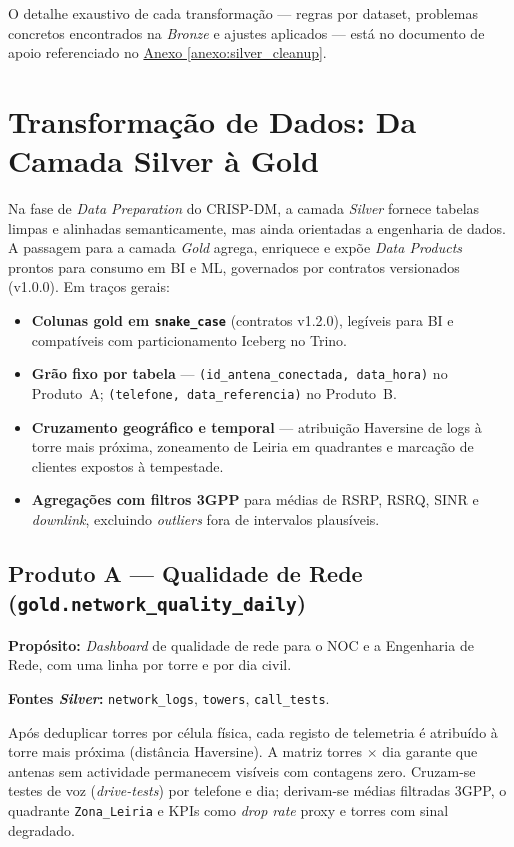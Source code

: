 \documentclass[runningheads]{llncs}
\begin{document}
O detalhe exaustivo de cada transformação --- regras por dataset, problemas concretos encontrados na \textit{Bronze} e ajustes aplicados --- está no documento de apoio referenciado no \hyperref[anexo:silver_cleanup]{Anexo \ref*{anexo:silver_cleanup}}.


\section{Transformação de Dados: Da Camada Silver à Gold}

Na fase de \textit{Data Preparation} do CRISP-DM, a camada \textit{Silver} fornece tabelas limpas e alinhadas semanticamente, mas ainda orientadas a engenharia de dados. A passagem para a camada \textit{Gold} agrega, enriquece e expõe \textit{Data Products} prontos para consumo em BI e ML, governados por contratos versionados (v1.0.0). Em traços gerais:

\begin{itemize}
    \item \textbf{Colunas gold em \texttt{snake\_case}} (contratos v1.2.0), legíveis para BI e compatíveis com particionamento Iceberg no Trino.
    \item \textbf{Grão fixo por tabela} --- \texttt{(id\_antena\_conectada, data\_hora)} no Produto~A; \texttt{(telefone, data\_referencia)} no Produto~B.
    \item \textbf{Cruzamento geográfico e temporal} --- atribuição Haversine de logs à torre mais próxima, zoneamento de Leiria em quadrantes e marcação de clientes expostos à tempestade.
    \item \textbf{Agregações com filtros 3GPP} para médias de RSRP, RSRQ, SINR e \textit{downlink}, excluindo \textit{outliers} fora de intervalos plausíveis.
\end{itemize}


\subsection{Produto A --- Qualidade de Rede (\texttt{gold.network\_quality\_daily})}

\textbf{Propósito:} \textit{Dashboard} de qualidade de rede para o NOC e a Engenharia de Rede, com uma linha por torre e por dia civil.

\textbf{Fontes \textit{Silver}:} \texttt{network\_logs}, \texttt{towers}, \texttt{call\_tests}.

Após deduplicar torres por célula física, cada registo de telemetria é atribuído à torre mais próxima (distância Haversine). A matriz torres $\times$ dia garante que antenas sem actividade permanecem visíveis com contagens zero. Cruzam-se testes de voz (\textit{drive-tests}) por telefone e dia; derivam-se médias filtradas 3GPP, o quadrante \texttt{Zona\_Leiria} e KPIs como \textit{drop rate} proxy e torres com sinal degradado.
\end{document}
